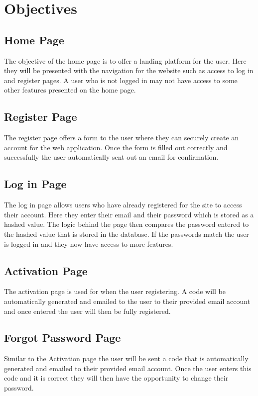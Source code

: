 \section{Objectives}
\subsection{Home Page}
The objective of the home page is to offer a landing platform for the user. Here they will be presented with the navigation for the website such as access to log in and register pages. A user who is not logged in may not have access to some other features presented on the home page.

\subsection{Register Page}
The register page offers a form to the user where they can securely create an account for the web application. Once the form is filled out correctly and successfully the user automatically sent out an email for confirmation.

\subsection{Log in Page}
The log in page allows users who have already registered for the site to access their account. Here they enter their email and their password which is stored as a hashed value. The logic behind the page then compares the password entered to the hashed value that is stored in the database. If the passwords match the user is logged in and they now have access to more features.

\subsection{Activation Page}
The activation page is used for when the user registering. A code will be automatically generated and emailed to the user to their provided email account and once entered the user will then be fully registered.

\subsection{Forgot Password Page}
Similar to the Activation page the user will be sent a code that is automatically generated and emailed to their provided email account. Once the user enters this code and it is correct they will then have the opportunity to change their password.

